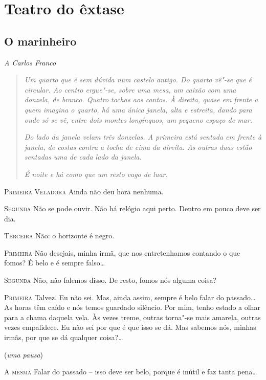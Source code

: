 \part{Teatro do êxtase}

\chapter[O marinheiro]{O marinheiro}

\hfill\textit{A Carlos Franco}

\begin{quotation}
\textit{Um quarto que é sem dúvida num castelo antigo. Do quarto vê"-se
que é circular. Ao centro ergue"-se, sobre uma mesa, um caixão com uma
donzela, de branco. Quatro tochas aos cantos. À direita, quase em
frente a quem imagina o quarto, há uma única janela, alta e estreita,
dando para onde só se vê, entre dois montes longínquos, um pequeno
espaço de mar.} 

\textit{Do lado da janela velam três donzelas. A primeira está sentada
em frente à janela, de costas contra a tocha de cima da direita. As
outras duas estão sentadas uma de cada lado da janela.} 

\textit{É noite e há como que um resto vago de luar.} 
\end{quotation}

\textsc{Primeira Veladora} Ainda não deu hora nenhuma.

\textsc{Segunda} Não se pode ouvir. Não há relógio aqui perto.
Dentro em pouco deve ser dia.

\textsc{Terceira} Não: o horizonte é negro.

\textsc{Primeira} Não desejais, minha irmã, que nos entretenhamos
contando o
que fomos? É belo e é sempre falso\ldots{}

\textsc{Segunda} Não, não falemos disso. De resto,
fomos nós alguma coisa?

\textsc{Primeira} Talvez. Eu não sei. Mas, ainda assim,
sempre é belo falar do
passado\ldots{} As horas têm caído e nós temos guardado
silêncio. Por mim,
tenho estado a olhar para a chama daquela vela.
Às vezes treme, outras
torna"-se mais amarela, outras vezes empalidece.
Eu não sei por que é
que isso se dá. Mas sabemos nós, minhas irmãs, por
que se dá qualquer coisa?\ldots{}

\hfill(\textit{uma pausa}) 

\textsc{A mesma} Falar do passado -- isso deve ser belo,
porque é inútil e faz tanta pena\ldots{}

